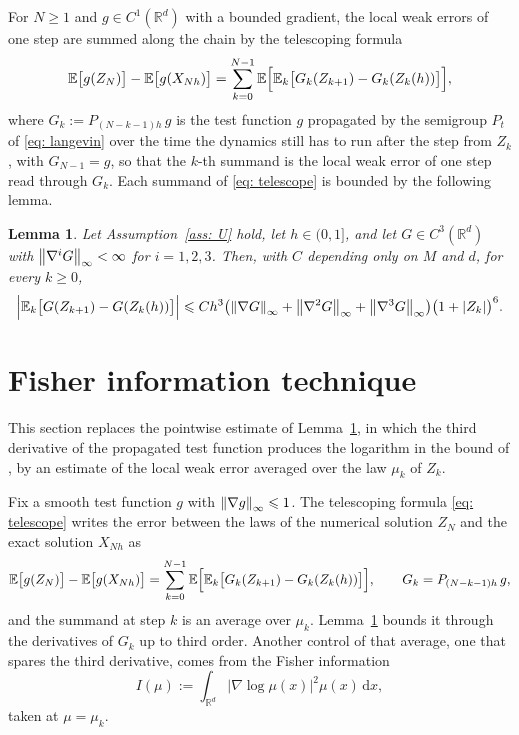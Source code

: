 \documentclass[namedate,webpdf,imanum]{ima-authoring-template}
\newcommand{\Le}{\leqslant}
\newcommand{\Ge}{\geqslant}
\newcommand{\D}{\mathrm{d}}
\theoremstyle{thmstyletwo}
\newtheorem{lemma}{Lemma}
\numberwithin{equation}{section}
\begin{document}
For $N \Ge 1$ and $g \in C^1(\mathbb R^d)$ with a bounded gradient, the local weak errors of one step are summed along the chain by the telescoping formula
\begin{equation}
    \mathbb E \bigl[g(Z_N)\bigr] - \mathbb E \bigl[g(X_{Nh})\bigr]
    = \sum_{k=0}^{N-1} \mathbb E\Bigl[ \mathbb E_k \bigl[ G_k(Z_{k+1}) - G_k(Z_k(h)) \bigr] \Bigr] ,
    \label{eq: telescope}
\end{equation}
where $G_k := P_{(N-k-1)h}\, g$ is the test function $g$ propagated by the semigroup $P_t$ of \eqref{eq: langevin} over the time the dynamics still has to run after the step from $Z_k$, with $G_{N-1} = g$, so that the $k$-th summand is the local weak error of one step read through $G_k$. Each summand of \eqref{eq: telescope} is bounded by the following lemma.

\begin{lemma}
\label{lem: weak}
    Let Assumption~\ref{ass: U} hold, let $h \in (0,1]$, and let $G \in C^3(\mathbb R^d)$ with $\norm{\nabla^i G}_\infty < \infty$ for $i = 1, 2, 3$. Then, with $C$ depending only on $M$ and $d$, for every $k \Ge 0$,
    \begin{equation}
        \Bigl| \mathbb E_k \bigl[ G(Z_{k+1}) - G(Z_k(h)) \bigr] \Bigr|
        \Le C h^3 \bigl( \norm{\nabla G}_\infty + \norm{\nabla^2 G}_\infty + \norm{\nabla^3 G}_\infty \bigr) \bigl( 1 + |Z_k| \bigr)^{6} .
        \label{eq: weak}
    \end{equation}
\end{lemma}

\section{Fisher information technique}
\label{sec: wasserstein analysis}

This section replaces the pointwise estimate of Lemma~\ref{lem: weak}, in which the third derivative of the propagated test function produces the logarithm in the bound of \citet{ye2026mse}, by an estimate of the local weak error averaged over the law $\mu_k$ of $Z_k$.

Fix a smooth test function $g$ with $\norm{\nabla g}_\infty \Le 1$. The telescoping formula \eqref{eq: telescope} writes the error between the laws of the numerical solution $Z_N$ and the exact solution $X_{Nh}$ as
\begin{equation*}
    \mathbb E \bigl[g(Z_N)\bigr] - \mathbb E \bigl[g(X_{Nh})\bigr]
    = \sum_{k=0}^{N-1} \mathbb E\Bigl[ \mathbb E_k \bigl[ G_k(Z_{k+1}) - G_k(Z_k(h)) \bigr] \Bigr] , \qquad G_k = P_{(N-k-1)h}\, g ,
\end{equation*}
and the summand at step $k$ is an average over $\mu_k$. Lemma~\ref{lem: weak} bounds it through the derivatives of $G_k$ up to third order. Another control of that average, one that spares the third derivative, comes from the Fisher information
\begin{equation}
    I(\mu) := \int_{\mathbb R^d} \bigl| \nabla \log \mu(x) \bigr|^2 \mu(x)\,\D x ,
    \label{eq: fisher information}
\end{equation}
taken at $\mu = \mu_k$.
\end{document}
